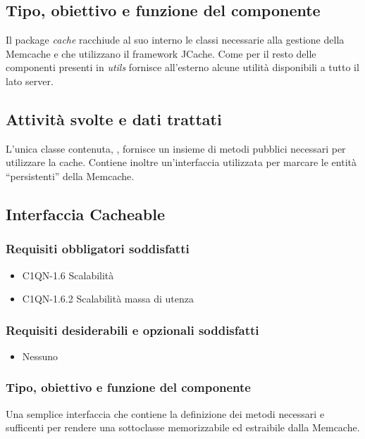 \subsection*{Tipo, obiettivo e funzione del componente}
Il package \emph{cache} racchiude al suo interno le classi necessarie alla
gestione della Memcache e che utilizzano il framework JCache. Come per il resto
delle componenti presenti in \emph{utils} fornisce all'esterno alcune utilit\`a
disponibili a tutto il lato server. 
\subsection*{Attivit\`a svolte e dati trattati} L'unica classe contenuta,
, fornisce un insieme di metodi pubblici necessari per
utilizzare la cache. Contiene inoltre un'interfaccia utilizzata per marcare le
entit\`a ``persistenti'' della Memcache.


\subsection{Interfaccia Cacheable}
\subsubsection*{Requisiti obbligatori soddisfatti}
\begin{itemize}
    \item C1QN-1.6 Scalabilit\`a
    \item C1QN-1.6.2 Scalabilit\`a massa di utenza
\end{itemize}
\subsubsection*{Requisiti desiderabili e opzionali soddisfatti}
\begin{itemize}
    \item Nessuno
\end{itemize}
\subsubsection*{Tipo, obiettivo e funzione del componente} Una semplice
interfaccia che contiene la definizione dei metodi necessari e sufficenti per
rendere una sottoclasse memorizzabile ed estraibile dalla Memcache.
